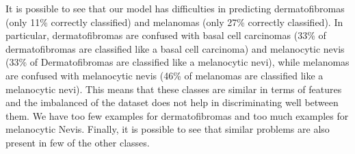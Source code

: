 		It is possible to see that our model has difficulties in predicting dermatofibromas (only 11\% correctly classified) and melanomas (only 27\% correctly classified). In particular, dermatofibromas are confused with basal cell carcinomas (33\% of dermatofibromas are classified like a basal cell carcinoma) and melanocytic nevis (33\% of Dermatofibromas are classified like a melanocytic nevi), while melanomas are confused with melanocytic nevis (46\% of melanomas are classified like a melanocytic nevi). 
		This means that these classes are similar in terms of features and the imbalanced of the dataset does not help in discriminating well between them. We have too few examples for dermatofibromas and too much examples for melanocytic Nevis. Finally, it is possible to see that similar problems are also present in few of the other classes.
				
			
		
		
		
		
		
		
		